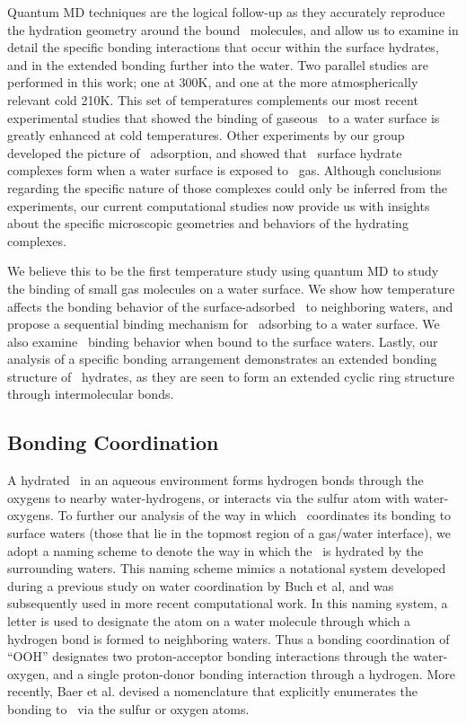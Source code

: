 \documentclass{article}
\begin{document}
Quantum MD techniques are the logical follow-up as they accurately reproduce the hydration geometry around the bound \suldiox~molecules, and allow us to examine in detail the specific bonding interactions that occur within the surface hydrates, and in the extended bonding further into the water.\cite{Baer2010} Two parallel studies are performed in this work; one at 300K, and one at the more atmospherically relevant cold 210K. This set of temperatures complements our most recent experimental studies that showed the binding of gaseous \suldiox~to a water surface is greatly enhanced at cold temperatures.\cite{Ota2011} Other experiments by our group developed the picture of \suldiox~adsorption, and showed that \suldiox~surface hydrate complexes form when a water surface is exposed to \suldiox~gas.\cite{Tarbuck2005,Tarbuck2006} Although conclusions regarding the specific nature of those complexes could only be inferred from the experiments, our current computational studies now provide us with insights about the specific microscopic geometries and behaviors of the hydrating complexes.

We believe this to be the first temperature study using quantum MD to study the binding of small gas molecules on a water surface. We show how temperature affects the bonding behavior of the surface-adsorbed \suldiox~to neighboring waters, and propose a sequential binding mechanism for \suldiox~adsorbing to a water surface. We also examine \suldiox~binding behavior when bound to the surface waters. Lastly, our analysis of a specific bonding arrangement demonstrates an extended bonding structure of \suldiox~hydrates, as they are seen to form an extended cyclic ring structure through intermolecular bonds.


\subsection {Bonding Coordination}

A hydrated \suldiox~in an aqueous environment forms hydrogen bonds through the oxygens to nearby water-hydrogens, or interacts via the sulfur atom with water-oxygens.\cite{Baer2010,Bishenden1998,Steudel2009} To further our analysis of the way in which \suldiox~coordinates its bonding to surface waters (those that lie in the topmost region of a gas/water interface), we adopt a naming scheme to denote the way in which the \suldiox~is hydrated by the surrounding waters. This naming scheme mimics a notational system developed during a previous study on water coordination by Buch et al,\cite{Buch 2005} and was subsequently used in more recent computational work.\cite{Walker2006b} In this naming system, a letter is used to designate the atom on a water molecule through which a hydrogen bond is formed to neighboring waters. Thus a bonding coordination of ``OOH'' designates two proton-acceptor bonding interactions through the water-oxygen, and a single proton-donor bonding interaction through a hydrogen. More recently, Baer et al. devised a nomenclature that explicitly enumerates the bonding to \suldiox~via the sulfur or oxygen atoms.\cite{Baer2010} 
\end{document}
